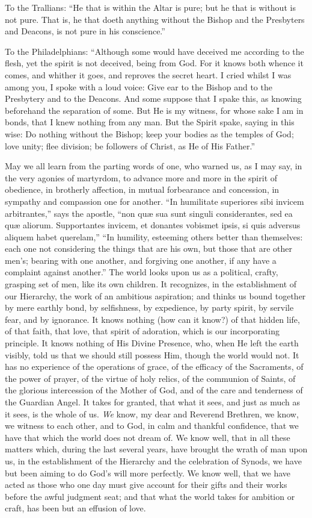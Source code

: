 To the Trallians: ``He that is within the Altar is
pure; but he that is without is not pure. That is, he
that doeth anything without the Bishop and the Presbyters
and Deacons, is not pure in his conscience.''

To the Philadelphians: ``Although some would have
deceived me according to the flesh, yet the spirit is not
deceived, being from God. For it knows both whence it
comes, and whither it goes, and reproves the secret
heart. I cried whilst I was among you, I spoke with a
loud voice: Give ear to the Bishop and to the Presbytery
and to the Deacons. And some suppose that I spake this,
as knowing beforehand the separation of some. But He is
my witness, for whose sake I am in bonds, that I knew
nothing from any man. But the Spirit spake, saying in
this wise: Do nothing without the Bishop; keep your bodies as the temples of God; love unity; flee division;
be followers of Christ, as He of His Father.''

May we all learn from the parting words of one, who
warned us, as I may say, in the very agonies of
martyrdom, to advance more and more in the spirit of
obedience, in brotherly affection, in mutual forbearance
and concession, in sympathy and compassion one for
another. ``In humilitate superiores sibi invicem
arbitrantes,'' says the apostle, ``non quæ sua
sunt singuli considerantes, sed ea quæ aliorum.
Supportantes invicem, et donantes vobismet ipsis, si quis
adversus aliquem habet querelam,'' ``In humility,
esteeming others better than themselves: each one not
considering the things that are his own, but those that
are other men's; bearing with one another, and forgiving
one another, if any have a complaint against
another.'' The world looks upon us as a political,
crafty, grasping set of men, like its own children. It
recognizes, in the establishment of our Hierarchy, the
work of an ambitious aspiration; and thinks us bound
together by mere earthly bond, by selfishness, by
expedience, by party spirit, by servile fear, and by
ignorance. It knows nothing (how can it know?) of that
hidden life, of that faith, that love, that spirit of
adoration, which is our incorporating principle. It knows
nothing of His Divine Presence, who, when He left the
earth visibly, told us that we should still possess Him,
though the world would not. It has no experience of the
operations of grace, of the efficacy of the Sacraments,
of the power of prayer, of the virtue of holy relics, of
the communion of Saints, of the glorious intercession of
the Mother of God, and of the care and tenderness of the
Guardian Angel. It takes for granted, that what it sees,
and just as much as it sees, is the whole of us. \emph{We}
know, my dear and Reverend Brethren, we know, we witness
to each other, and to God, in calm and thankful
confidence, that we have that which the world does not
dream of. We know well, that in all these matters which,
during the last several years, have brought the wrath of
man upon us, in the establishment of the Hierarchy and
the celebration of Synods, we have but been aiming to do
God's will more perfectly. We know well, that we have
acted as those who one day must give account for their
gifts and their works before the awful judgment seat; and
that what the world takes for ambition or craft, has been
but an effusion of love.

